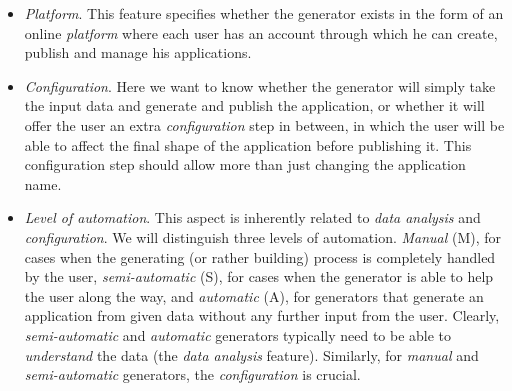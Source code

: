 \begin{itemize}
\item \emph{Platform}. This feature specifies whether the generator exists in the form of an online \emph{platform} where each user has an account through which he can create, publish and manage his applications.
\item \emph{Configuration}. Here we want to know whether the generator will simply take the input data and generate and publish the application, or whether it will offer the user an extra \emph{configuration} step in between, in which the user will be able to affect the final shape of the application before publishing it. This configuration step should allow more than just changing the application name.
\item \emph{Level of automation}. This aspect is inherently related to \emph{data analysis} and \emph{configuration}. We will distinguish three levels of automation. \emph{Manual} (M), for cases when the generating (or rather building) process is completely handled by the user, \emph{semi-automatic} (S), for cases when the generator is able to help the user along the way, and \emph{automatic} (A), for generators that generate an application from given data without any further input from the user. Clearly, \emph{semi-automatic} and \emph{automatic} generators typically need to be able to \emph{understand} the data (the \emph{data analysis} feature). Similarly, for \emph{manual} and \emph{semi-automatic} generators, the \emph{configuration} is crucial.
\end{itemize}

